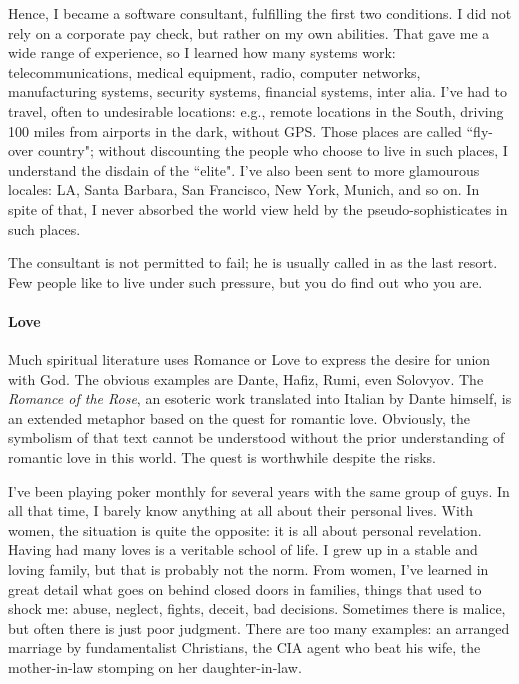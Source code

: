 Hence, I became a software consultant, fulfilling the first two conditions. I did not rely on a corporate pay check, but rather on my own abilities. That gave me a wide range of experience, so I learned how many systems work: telecommunications, medical equipment, radio, computer networks, manufacturing systems, security systems, financial systems, inter alia. I've had to travel, often to undesirable locations: e.g., remote locations in the South, driving 100 miles from airports in the dark, without GPS. Those places are called ``fly-over country"; without discounting the people who choose to live in such places, I understand the disdain of the ``elite". I've also been sent to more glamourous locales: LA, Santa Barbara, San Francisco, New York, Munich, and so on. In spite of that, I never absorbed the world view held by the pseudo-sophisticates in such places.

The consultant is not permitted to fail; he is usually called in as the last resort. Few people like to live under such pressure, but you do find out who you are.

\paragraph{Love}
Much spiritual literature uses Romance or Love to express the desire for union with God. The obvious examples are Dante, Hafiz, Rumi, even Solovyov. The \emph{Romance of the Rose}, an esoteric work translated into Italian by Dante himself, is an extended metaphor based on the quest for romantic love. Obviously, the symbolism of that text cannot be understood without the prior understanding of romantic love in this world. The quest is worthwhile despite the risks.

I've been playing poker monthly for several years with the same group of guys. In all that time, I barely know anything at all about their personal lives. With women, the situation is quite the opposite: it is all about personal revelation. Having had many loves is a veritable school of life. I grew up in a stable and loving family, but that is probably not the norm. From women, I've learned in great detail what goes on behind closed doors in families, things that used to shock me: abuse, neglect, fights, deceit, bad decisions. Sometimes there is malice, but often there is just poor judgment. There are too many examples: an arranged marriage by fundamentalist Christians, the CIA agent who beat his wife, the mother-in-law stomping on her daughter-in-law. 

